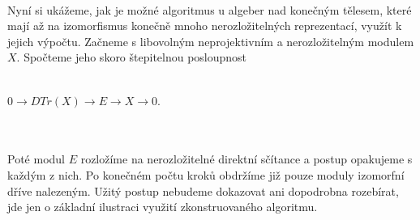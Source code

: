          \paragraph{ }        Nyní si ukážeme, jak je možné algoritmus 
         u algeber nad konečným tělesem, 
         které mají až na izomorfismus konečně mnoho nerozložitelných 
         reprezentací, využít k jejich výpočtu. Začneme s libovolným 
         neprojektivním a nerozložitelným modulem $X$. Spočteme jeho skoro 
         štepitelnou posloupnost \\\\
         \centerline{$0 \to DTr(X) \to E \to X \to 0$.} \\\\
         Poté modul $E$ rozložíme na nerozložitelné direktní sčítance a postup 
         opakujeme s každým z nich. Po konečném počtu kroků obdržíme 
         již pouze moduly izomorfní dříve nalezeným. Užitý postup nebudeme 
         dokazovat ani dopodrobna rozebírat, jde jen o základní ilustraci 
         využití zkonstruovaného algoritmu.
                  
